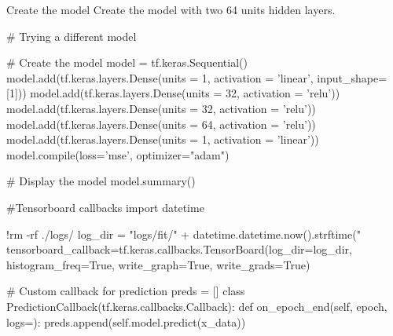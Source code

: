 Create the model Create
the model with two 64 units hidden layers.



# Trying a different model

# Create the model 
model = tf.keras.Sequential()
model.add(tf.keras.layers.Dense(units = 1, activation = 'linear', input_shape=[1]))
model.add(tf.keras.layers.Dense(units = 32, activation = 'relu'))
model.add(tf.keras.layers.Dense(units = 32, activation = 'relu'))
model.add(tf.keras.layers.Dense(units = 64, activation = 'relu'))
model.add(tf.keras.layers.Dense(units = 1, activation = 'linear'))
model.compile(loss='mse', optimizer="adam")

# Display the model
model.summary()



#Tensorboard callbacks
import datetime

!rm -rf ./logs/
log_dir = "logs/fit/" + datetime.datetime.now().strftime("%
tensorboard_callback=tf.keras.callbacks.TensorBoard(log_dir=log_dir, histogram_freq=True, write_graph=True, write_grads=True)

# Custom callback for prediction
preds = []
class PredictionCallback(tf.keras.callbacks.Callback):    
def on_epoch_end(self, epoch, logs={}):
preds.append(self.model.predict(x_data))
